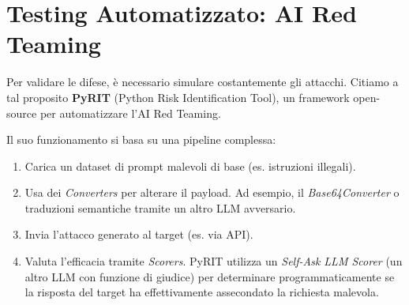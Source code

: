 \section{Testing Automatizzato: AI Red Teaming}

Per validare le difese, è necessario simulare costantemente gli attacchi. 
Citiamo a tal proposito \textbf{PyRIT} (Python Risk Identification Tool), 
un framework open-source per automatizzare l'AI Red Teaming.

Il suo funzionamento si basa su una pipeline complessa:

\begin{enumerate}
    \item Carica un dataset di prompt malevoli di base (es. istruzioni illegali).
    \item Usa dei \textit{Converters} per alterare il payload. Ad esempio, 
    il \textit{Base64Converter} o traduzioni semantiche tramite un altro 
    LLM avversario.
    \item Invia l'attacco generato al target (es. via API).
    \item Valuta l'efficacia tramite \textit{Scorers}. PyRIT utilizza un 
    \textit{Self-Ask LLM Scorer} (un altro LLM con funzione di giudice) 
    per determinare programmaticamente se la risposta del target ha 
    effettivamente assecondato la richiesta malevola.
\end{enumerate}